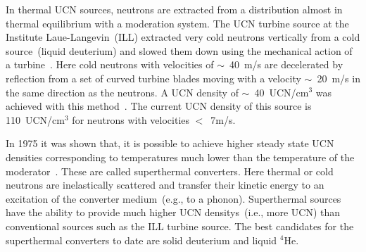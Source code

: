 In thermal UCN sources, neutrons are extracted from a distribution
almost in thermal equilibrium with a moderation system.  The UCN
turbine source at the Institute Laue-Langevin~(ILL) extracted very
cold neutrons vertically from a cold source~(liquid deuterium) and
slowed them down using the mechanical action of a
turbine~\cite{Steyerl1986,Steyerl1975}. Here cold neutrons with
velocities of $\sim$~40~m/s are decelerated by reflection from a set
of curved turbine blades moving with a velocity $\sim$~20~m/s in the
same direction as the neutrons. A UCN density of $\sim$~40~UCN/cm$^3$
was achieved with this method~\cite{ucnbook,Albert_talk}. The current
UCN density of this source is 110~UCN/cm$^3$ for neutrons with
velocities $<$~7m/s\cite{Steyerl1986}.


In 1975 it was shown that, it is possible to achieve higher steady
state UCN densities corresponding to temperatures much lower than the
temperature of the moderator~\cite{Golub75}. These are called
superthermal converters. Here thermal or cold neutrons are
inelastically scattered and transfer their kinetic energy to an
excitation of the converter medium~(e.g., to a phonon).
Superthermal sources have the ability to provide much higher UCN
densitys~(i.e., more UCN) than conventional sources such as the
ILL turbine source.  The best candidates for the superthermal
converters to date are solid deuterium and liquid $^4$He.




